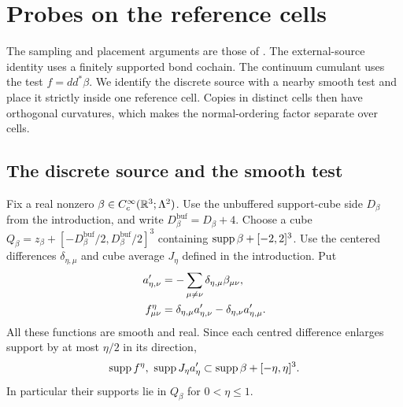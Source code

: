 \section{Probes on the reference cells}\label{sec:reference-cells}

The sampling and placement arguments are those of
\cite[\S19]{QED3Master}. The external-source identity uses a finitely supported bond cochain.
The continuum cumulant uses the test $f=dd^*\beta$. We identify the
discrete source with a nearby smooth test and place it strictly inside
one reference cell. Copies in distinct cells then have orthogonal
curvatures, which makes the normal-ordering factor separate over cells.

\subsection{The discrete source and the smooth test}

Fix a real nonzero $\beta\in C_c^\infty(\mathbb R^3;\Lambda^2)$.
Use the unbuffered support-cube side $D_\beta$ from the introduction,
and write
$D_\beta^{\mathrm{buf}}=D_\beta+4$. Choose a cube
$Q_\beta=z_\beta+[-D_\beta^{\mathrm{buf}}/2,
D_\beta^{\mathrm{buf}}/2]^3$ containing
$\operatorname{supp}\beta+[-2,2]^3$. Use the centered differences
$\delta_{\eta,\mu}$ and cube average $J_\eta$ defined in the introduction.
Put
\begin{align}
 a'_{\eta,\nu}&=-\sum_{\mu\ne\nu}
                          \delta_{\eta,\mu}\beta_{\mu\nu},\notag\\
 f^\eta_{\mu\nu}&=\delta_{\eta,\mu}a'_{\eta,\nu}
                         -\delta_{\eta,\nu}a'_{\eta,\mu}.
                                      \label{eq:cells-smooth-test}
\end{align}
All these functions are smooth and real. Since each centred
difference enlarges support by at most $\eta/2$ in its direction,
\[
 \operatorname{supp} f^\eta,\ \operatorname{supp} J_\eta a'_\eta
                   \subset\operatorname{supp}\beta+[-\eta,\eta]^3.
\]
In particular their supports lie in $Q_\beta$ for $0<\eta\le1$.

